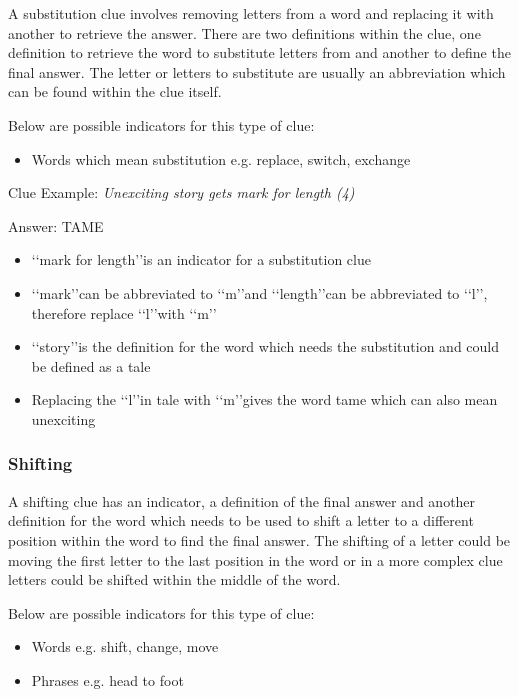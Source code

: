 A substitution clue involves removing letters from a word and replacing it with another to retrieve the answer. There are two definitions within the clue, one definition to retrieve the word to substitute letters from and another to define the final answer. The letter or letters to substitute are usually an abbreviation which can be found within the clue itself. 

Below are possible indicators for this type of clue:
\begin{itemize} 
	\item Words which mean substitution e.g. replace, switch, exchange
\\
\end{itemize}

Clue Example: \emph{Unexciting story gets mark for length (4)}

Answer: TAME 

\begin{itemize}
	\item \lq\lq mark for length\rq\rq is an indicator for a substitution clue  
	\item \lq\lq mark\rq\rq can be abbreviated to \lq\lq m\rq\rq and \lq\lq length\rq\rq can be abbreviated to \lq\lq l\rq\rq, therefore replace \lq\lq l\rq\rq with \lq\lq m\rq\rq 
	\item \lq\lq story\rq\rq is the definition for the word which needs the substitution and could be defined as a tale 
	\item Replacing the \lq\lq l\rq\rq in tale with \lq\lq m\rq\rq gives the word tame which can also mean unexciting 
\end{itemize}

\subsubsection{Shifting}

A shifting clue has an indicator, a definition of the final answer and another definition for the word which needs to be used to shift a letter to a different position within the word to find the final answer. The shifting of a letter could be moving the first letter to the last position in the word or in a more complex clue letters could be shifted within the middle of the word.  

Below are possible indicators for this type of clue:
\begin{itemize} 
	\item Words e.g. shift, change, move 
	\item Phrases e.g. head to foot 
\\
\end{itemize}


